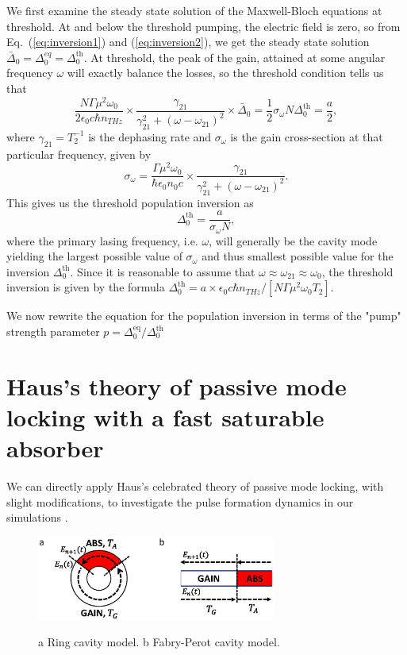 \documentclass[preprint,secnumarabic,amssymb, nobibnotes, aip, prd]{revtex4-1}
\begin{document}
We first examine the steady state solution of the Maxwell-Bloch equations at threshold. At and below the threshold pumping, the electric field is zero, so from Eq.~(\ref{eq:inversion1}) and (\ref{eq:inversion2}), we get the steady state solution $\bar{\Delta}_0 = \Delta_{0}^{eq} = \Delta_0^{\text{th}}$. At threshold, the peak of the gain, attained at some angular frequency $\omega$ will exactly balance the losses, so the threshold condition tells us that
\begin{equation}
\label{eq:gain-loss-threshold}
\frac{N\Gamma\mu^2\omega_0}{2 \epsilon_0 c \hbar n_{THz}}\times\frac{\gamma_{21}}{\gamma_{21}^2+(\omega-\omega_{21})^2}\times\bar{\Delta}_0 =\frac{1}{2}\sigma_\omega N \Delta_0^{\text{th}} = \frac{a}{2},
\end{equation}
where $\gamma_{21} = T_2^{-1}$ is the dephasing rate and $\sigma_\omega$ is the gain cross-section at that particular frequency, given by
\begin{equation}
\label{eq:cross-section}
\sigma_\omega = \frac{\Gamma \mu^2\omega_{0}}{\hbar\epsilon_0n_0c}\times\frac{\gamma_{21}}{\gamma_{21}^2+(\omega-\omega_{21})^2}.
\end{equation}
This gives us the threshold population inversion as 
\begin{equation}
\label{eq:threshold-inversion}
\Delta_0^{\text{th}} = \frac{a}{\sigma_{\omega}N}, 
\end{equation}
where the primary lasing frequency, i.e. $\omega$, will generally be the cavity mode yielding the largest possible value of $\sigma_\omega$ and thus smallest possible value for the inversion $\Delta_{0}^{\text{th}}$. Since it is reasonable to assume that $\omega \approx \omega_{21}\approx\omega_0$, the threshold inversion is given by the formula $\Delta_0^{\text{th}} = a \times \epsilon_0 c \hbar n_{THz}/\left [N\Gamma\mu^2\omega_0 T_2\right ]$.

We now rewrite the equation for the population inversion in terms of the "pump" strength parameter $p=\Delta_0^{\text{eq}}/\Delta_0^{\text{th}}$

\section{Haus's theory of passive mode locking with a fast saturable absorber}

We can directly apply Haus's celebrated theory of passive mode locking, with slight modifications, to investigate the pulse formation dynamics in our simulations \cite{haus1975theory}.
\begin{center}
	\begin{figure}	
	\includegraphics[width=0.7\textwidth]{IMGS/CAVITIES} \label{fig:cavities}\caption{a Ring cavity model. b Fabry-Perot cavity model.}
	\end{figure}
\end{center}
\end{document}
